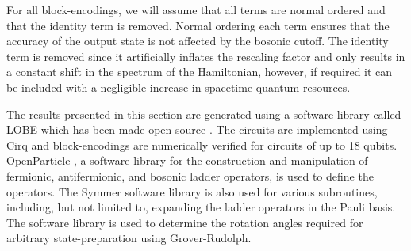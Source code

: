 For all block-encodings, we will assume that all terms are normal ordered and that the identity term is removed.
Normal ordering each term ensures that the accuracy of the output state is not affected by the bosonic cutoff.
The identity term is removed since it artificially inflates the rescaling factor and only results in a constant shift in the spectrum of the Hamiltonian, however, if required it can be included with a negligible increase in spacetime quantum resources.

The results presented in this section are generated using a software library called LOBE which has been made open-source \cite{}.
The circuits are implemented using Cirq \cite{cirq} and block-encodings are numerically verified for circuits of up to 18 qubits.
OpenParticle \cite{openparticle}, a software library for the construction and manipulation of fermionic, antifermionic, and bosonic ladder operators, is used to define the operators.
The Symmer software library \cite{} is also used for various subroutines, including, but not limited to, expanding the ladder operators in the Pauli basis.
The software library \cite{grover-rudolph-github} is used to determine the rotation angles required for arbitrary state-preparation using Grover-Rudolph.






